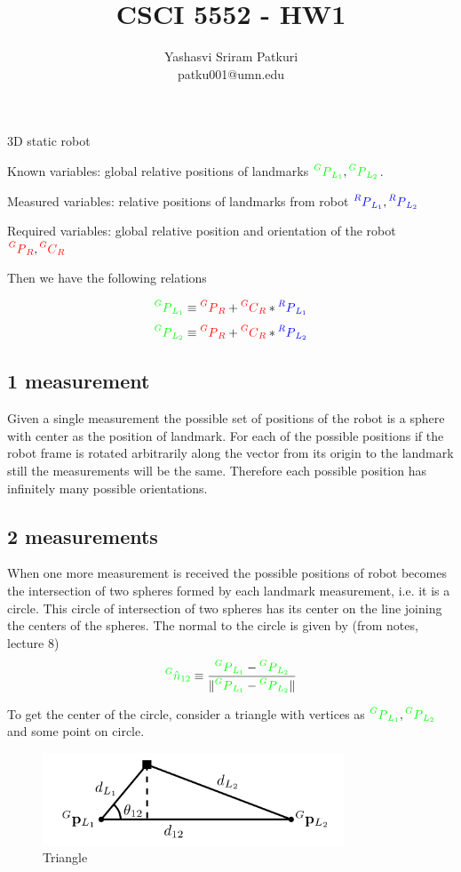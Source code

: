 \documentclass[12pt]{article}
\title{CSCI 5552 - HW1}
\author{Yashasvi Sriram Patkuri\\patku001@umn.edu}
\newcommand{\rxpy}[2]{{\color{red} \prescript{#1}{}{P}_{#2}}}
\newcommand{\gxpy}[2]{{\color{green} \prescript{#1}{}{P}_{#2}}}
\newcommand{\bxpy}[2]{{\color{blue} \prescript{#1}{}{P}_{#2}}}
\newcommand{\rxcy}[2]{{\color{red} \prescript{#1}{}{C}_{#2}}}
\begin{document}
\maketitle
\pagebreak

\section{}
3D static robot

Known variables: global relative positions of landmarks $ \gxpy{G}{L_1}, \gxpy{G}{L_2} $.

Measured variables: relative positions of landmarks from robot {\color{blue} $ \bxpy{R}{L_1}, \bxpy{R}{L_2} $ }

Required variables: global relative position and orientation of the robot {\color{red} $ \rxpy{G}{R}, \rxcy{G}{R} $ }

Then we have the following relations

\[
  \gxpy{G}{L_1} \equiv \rxpy{G}{R} + \rxcy{G}{R} * \bxpy{R}{L_1}
\]
\[
  \gxpy{G}{L_2} \equiv \rxpy{G}{R} + \rxcy{G}{R} * \bxpy{R}{L_2}
\]
\subsection*{1 measurement}
Given a single measurement the possible set of positions of the robot is a sphere with center as the position of landmark.
For each of the possible positions if the robot frame is rotated arbitrarily along the vector from its origin to the landmark still the measurements will be the same.
Therefore each possible position has infinitely many possible orientations.

\subsection*{2 measurements}
When one more measurement is received the possible positions of robot becomes the intersection of two spheres formed by each landmark measurement, i.e. it is a circle.
This circle of intersection of two spheres has its center on the line joining the centers of the spheres.
The normal to the circle is given by (from notes, lecture 8)
\[
  {\color{green} \prescript{G}{}{\hat{n}}_{12}} \equiv \frac{\gxpy{G}{L_1} - \gxpy{G}{L_2}}{\Vert \gxpy{G}{L_1} - \gxpy{G}{L_2} \Vert}
\]

To get the center of the circle, consider a triangle with vertices as $ \gxpy{G}{L_1}, \gxpy{G}{L_2}  $ and some point on circle.
\begin{figure}[h!]
  \centering
  \includegraphics[width=0.8\textwidth]{1.png}
  \caption{Triangle}
  \label{fig:1}
\end{figure}
\end{document}
